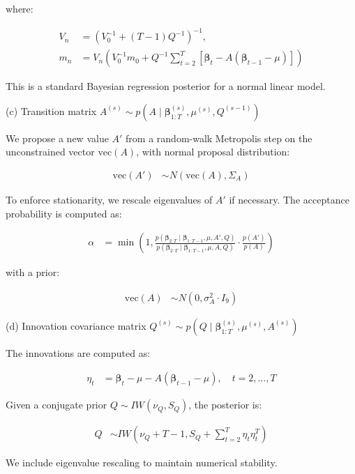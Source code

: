 where:

\begin{align*}
V_n &= \left(V_0^{-1} + (T-1) Q^{-1}\right)^{-1}, \\
m_n &= V_n \left(V_0^{-1} m_0 + Q^{-1} \sum_{t=2}^{T} \left[\mathbf{\beta}_t - A(\mathbf{\beta}_{t-1} - \mu)\right] \right)
\end{align*}

This is a standard Bayesian regression posterior for a normal linear model.

(c) Transition matrix $A^{(s)} \sim p(A \mid \mathbf{\beta}_{1:T}^{(s)}, \mu^{(s)}, Q^{(s-1)})$

We propose a new value $A'$ from a random-walk Metropolis step on the unconstrained vector $\text{vec}(A)$, with normal proposal distribution:

\begin{align*}
\text{vec}(A') &\sim N(\text{vec}(A), \Sigma_A)
\end{align*}

To enforce stationarity, we rescale eigenvalues of $A'$ if necessary. The acceptance probability is computed as:

\begin{align*}
\alpha &= \min\left(1, \frac{p(\mathbf{\beta}_{2:T} \mid \mathbf{\beta}_{1:T-1}, \mu, A', Q)}{p(\mathbf{\beta}_{2:T} \mid \mathbf{\beta}_{1:T-1}, \mu, A, Q)} \cdot \frac{p(A')}{p(A)} \right)
\end{align*}

with a prior:

\begin{align*}
\text{vec}(A) &\sim N(0, \sigma_A^2 \cdot I_9)
\end{align*}

(d) Innovation covariance matrix $Q^{(s)} \sim p(Q \mid \mathbf{\beta}_{1:T}^{(s)}, \mu^{(s)}, A^{(s)})$

The innovations are computed as:

\begin{align*}
\eta_t &= \mathbf{\beta}_t - \mu - A(\mathbf{\beta}_{t-1} - \mu), \quad t=2, \dots, T
\end{align*}

Given a conjugate prior $Q \sim IW(\nu_Q, S_Q)$, the posterior is:

\begin{align*}
Q &\sim IW(\nu_Q + T - 1, S_Q + \sum_{t=2}^{T} \eta_t \eta_t^T)
\end{align*}

We include eigenvalue rescaling to maintain numerical stability.

